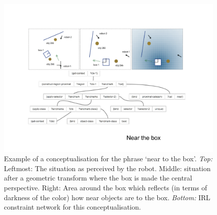 \begin{figure}
\centerline{\includegraphics[width=1.0\linewidth]{chap11/figs/near-the-box2.pdf}}
\caption{Example of a conceptualisation for the phrase `near to the box'. {\itshape Top:} 
Leftmost: The situation as perceived by the robot. Middle: situation after a geometric transform where the box is 
made the central perspective. Right: Area around the box which reflects (in terms of darkness of the color) how 
near objects are to the box. {\itshape Bottom:} IRL constraint network for this conceptualisation.
\label{fig:spatial-strategies}}
\end{figure}

